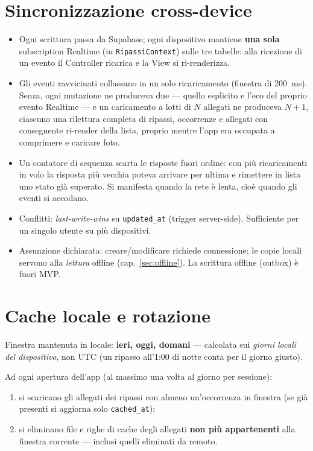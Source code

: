 \documentclass[11pt,a4paper]{report}
\begin{document}
\chapter{Sincronizzazione cross-device}

\begin{itemize}[nosep]
  \item Ogni scrittura passa da Supabase; ogni dispositivo mantiene
        \textbf{una sola} subscription Realtime (in \texttt{RipassiContext})
        sulle tre tabelle: alla ricezione di un evento il Controller ricarica
        e la View si ri-renderizza.
  \item Gli eventi ravvicinati collassano in un solo ricaricamento (finestra
        di 200~ms). Senza, ogni mutazione ne produceva due --- quello
        esplicito e l'eco del proprio evento Realtime --- e un caricamento a
        lotti di $N$ allegati ne produceva $N+1$, ciascuno una rilettura
        completa di ripassi, occorrenze e allegati con conseguente
        ri-render della lista, proprio mentre l'app era occupata a
        comprimere e caricare foto.
  \item Un contatore di sequenza scarta le risposte fuori ordine: con pi\`u
        ricaricamenti in volo la risposta pi\`u vecchia poteva arrivare per
        ultima e rimettere in lista uno stato gi\`a superato. Si manifesta
        quando la rete \`e lenta, cio\`e quando gli eventi si accodano.
  \item Conflitti: \emph{last-write-wins} su \texttt{updated\_at} (trigger
        server-side). Sufficiente per un singolo utente su pi\`u dispositivi.
  \item Assunzione dichiarata: creare/modificare richiede connessione; le
        copie locali servono alla \emph{lettura} offline (cap.~\ref{sec:offline}).
        La scrittura offline (outbox) \`e fuori MVP.
\end{itemize}

\chapter{Cache locale e rotazione}
\label{sec:cache}

Finestra mantenuta in locale: \textbf{ieri, oggi, domani} — calcolata sui
\emph{giorni locali del dispositivo}, non UTC (un ripasso all'1:00 di notte
conta per il giorno giusto).

Ad ogni apertura dell'app (al massimo una volta al giorno per sessione):
\begin{enumerate}[nosep]
  \item si scaricano gli allegati dei ripassi con almeno un'occorrenza in
        finestra (se gi\`a presenti si aggiorna solo \texttt{cached\_at});
  \item si eliminano file e righe di cache degli allegati \textbf{non pi\`u
        appartenenti} alla finestra corrente — inclusi quelli eliminati da
        remoto.
\end{enumerate}
\end{document}
